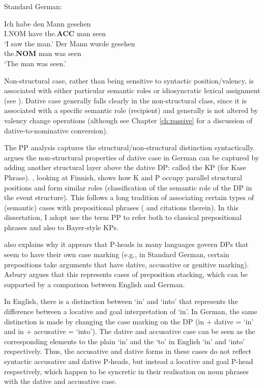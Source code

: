 \begin{exe}
	\ex Standard German:
	\begin{xlist}
		\ex \gll Ich habe den Mann gesehen\\
		I.NOM have the.\textbf{ACC} man seen\\
		\trans `I saw the man.'
		\ex \gll Der Mann wurde gesehen\\
		the.\textbf{NOM} man was seen\\
		\trans `The man was seen.'
	\end{xlist}
\end{exe}

Non-structural case, rather than being sensitive to syntactic position/valency, is associated with either particular semantic roles or idiosyncratic lexical assignment (see \citealt{Woolford.2006}). Dative case generally falls clearly in the non-structural class, since it is associated with a specific semantic role (recipient) and generally is not altered by valency change operations (although see Chapter \ref{ch:passive} for a discussion of dative-to-nominative conversion). 

The PP analysis captures the structural/non-structural distinction syntactically. \cite{Bayer.2001} argues the non-structural properties of dative case in German can be captured by adding another structural layer above the dative DP: called the KP (for Kase Phrase). \cite{Asbury.2007}, looking at Finnish, shows how K and P occupy parallel structural positions and form similar roles (classification of the semantic role of the DP in the event structure). This follows a long tradition of associating certain types of (semantic) cases with prepositional phrases (\citealt{McFadden.2004} and citations therein). In this dissertation, I adopt use the term PP to refer both to classical prepositional phrases and also to Bayer-style KPs.

\cite{Asbury.2005} also explains why it appears that P-heads in many languages govern DPs that seem to have their own case marking (e.g., in Standard German, certain prepositions take arguments that have dative, accusative or genitive marking). Asbury argues that this represents cases of preposition stacking, which can be supported by a comparison between English and German. 

In English, there is a distinction between `in' and `into' that represents the difference between a locative and goal interpretation of `in'. In German, the same distinction is made by changing the case marking on the DP (in + dative = `in' and in + accusative = `into'). The dative and accusative case can be seen as the corresponding elements to the plain `in' and the `to' in English `in' and `into' respectively. Thus, the accusative and dative forms in these cases do not reflect syntactic accusative and dative P-heads, but instead a locative and goal P-head respectively, which happen to be syncretic in their realisation on noun phrases with the dative and accusative case.

